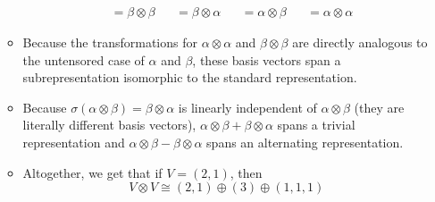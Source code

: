 \documentclass[../notes.tex]{subfiles}
\begin{document}
\begin{itemize}
\begin{itemize}
\begin{align*}
            &= \beta\otimes\beta&
                &= \beta\otimes\alpha&
                    &= \alpha\otimes\beta&
                        &= \alpha\otimes\alpha
        \end{align*}
        \item Because the transformations for $\alpha\otimes\alpha$ and $\beta\otimes\beta$ are directly analogous to the untensored case of $\alpha$ and $\beta$, these basis vectors span a subrepresentation isomorphic to the standard representation.
        \item Because $\sigma(\alpha\otimes\beta)=\beta\otimes\alpha$ is linearly independent of $\alpha\otimes\beta$ (they are literally different basis vectors), $\alpha\otimes\beta+\beta\otimes\alpha$ spans a trivial representation and $\alpha\otimes\beta-\beta\otimes\alpha$ spans an alternating representation.
        \item Altogether, we get that if $V=(2,1)$, then
        \begin{equation*}
            V\otimes V \cong (2,1)\oplus(3)\oplus(1,1,1)
        \end{equation*}
    \end{itemize}
\end{itemize}
\end{document}
